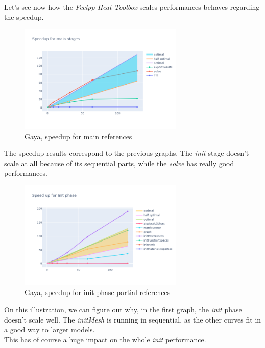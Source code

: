 \documentclass[12pt]{article}
\begin{document}
\vspace{20pt}

Let's see now how the \textit{Feelpp Heat Toolbox} scales performances behaves regarding the speedup.
\begin{figure}[H]
    \centering
    \includegraphics[width=0.7\textwidth]{../illustrations/gaya-graphs/gayaSpeedup.png}
    \caption{Gaya, speedup for main references}
\end{figure}

The speedup results correspond to the previous graphs.
The \textit{init} stage doesn't scale at all because of its sequential parts, while the \textit{solve} has really good performances.


\begin{figure}[H]
    \centering
    \includegraphics[width=0.7\textwidth]{../illustrations/gaya-graphs/gayaInit.png}
    \caption{Gaya, speedup for init-phase partial references}
\end{figure}

On this illustration, we can figure out why, in the first graph, the \textit{init} phase doesn't scale well. 
The \textit{initMesh} is running in sequential, as the other curves fit in a good way to larger models. \\
This has of course a huge impact on the whole \textit{init} performance.
\end{document}
